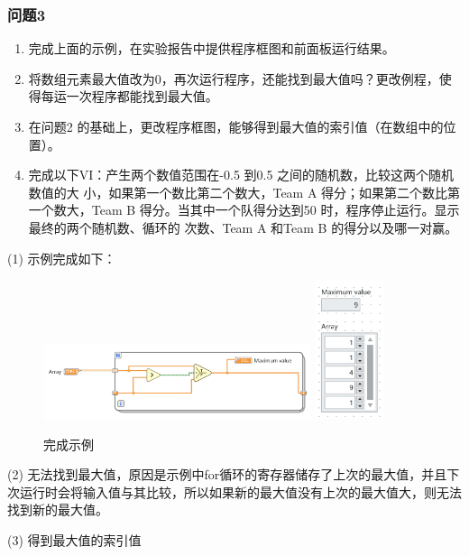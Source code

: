 \documentclass{../source/Experiment}
\begin{document}
\subsubsection{问题3}
\begin{enumerate}
    \item 完成上面的示例，在实验报告中提供程序框图和前面板运行结果。
    \item 将数组元素最大值改为0，再次运行程序，还能找到最大值吗？更改例程，使得每运一次程序都能找到最大值。
    \item 在问题2 的基础上，更改程序框图，能够得到最大值的索引值（在数组中的位置）。
    \item 完成以下VI：产生两个数值范围在-0.5 到0.5 之间的随机数，比较这两个随机数值的大
          小，如果第一个数比第二个数大，Team A 得分；如果第二个数比第一个数大，Team B
          得分。当其中一个队得分达到50 时，程序停止运行。显示最终的两个随机数、循环的
          次数、Team A 和Team B 的得分以及哪一对赢。
\end{enumerate}

(1) 示例完成如下：

\begin{figure}[H]
    \centering
    \includegraphics[width = 0.7\textwidth]{lab8/lab1-数组-a.jpg}
    \includegraphics[width = 0.18\textwidth]{lab8/lab1-数组-b.jpg}
    \caption{完成示例}
\end{figure}

(2) 无法找到最大值，原因是示例中for循环的寄存器储存了上次的最大值，并且下次运行时会将输入值与其比较，所以如果新的最大值没有上次的最大值大，则无法找到新的最大值。

(3) 得到最大值的索引值
\end{document}
